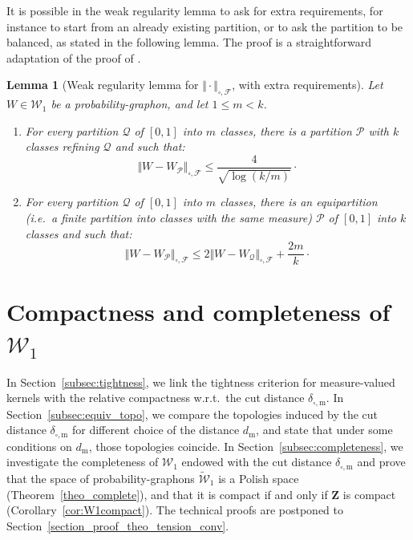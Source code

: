 \documentclass{amsart}
\newcommand{\wrt}{w.r.t.\ }
\newcommand{\ie}{i.e.\ }
\theoremstyle{plain}
\newtheorem{lemme}[Th]{Lemma}
\theoremstyle{definition}
\newcommand{\Space}{\mathbf{Z}}
\newcommand{\Graphon}{\mathcal{W}_1}
\newcommand{\UGraphon}{\widetilde{\mathcal{W}}_1}
\newcommand{\m}{\mathrm{m}}
\newcommand{\dmeas}{d_\m}
\newcommand{\ddcut}{\delta_{\square,\m}}
\newcommand{\NcutFSymbol}{\Vert\cdot\Vert_{\square,\mathcal{F}}}
\newcommand{\F}{\mathcal{F}}
\newcommand{\norm}[1]{\Vert#1\Vert}
\begin{document}
It is possible in the weak regularity lemma to ask for extra requirements,
for instance to start from an already existing partition,
or to ask the partition to be balanced,
as stated in the following lemma.
The proof is a straightforward adaptation of the proof of \cite[Lemma~9.15]{Lovasz}.

\begin{lemme}[Weak regularity lemma for $\NcutFSymbol$, with extra requirements]\label{Regularity_Lemma_2}
Let $W\in\Graphon$ be a probability-graphon, and let $1\leq m < k$.
\begin{enumerate}[label=(\roman*)]
\item\label{Regularity_Lemma_2a} For every partition $\mathcal{Q}$ of $[0,1]$ into $m$ classes,
there is a partition $\mathcal{P}$ with $k$ classes refining $\mathcal{Q}$
and such that:
\[  \norm{W - W_\mathcal{P}}_{\square,\F} \leq \frac{4}{\sqrt{\log (k/m)}}
\cdot \]
\item\label{Regularity_Lemma_2b} For every partition $\mathcal{Q}$ of $[0,1]$ into $m$ classes,
there is an equipartition (\ie a finite partition into classes with the same measure)
$\mathcal{P}$ of $[0,1]$ into $k$ classes and such that:
\[  \norm{W - W_\mathcal{P}}_{\square,\F} \leq 2 \norm{W - W_\mathcal{Q}}_{\square,\F} + \frac{2m}{k}
\cdot \]
\end{enumerate}
\end{lemme}





\section{Compactness and completeness of \texorpdfstring{$\Graphon$}{}}
\label{section_tension}

In Section~\ref{subsec:tightness},  we link the tightness  criterion for
measure-valued kernels  with the relative compactness \wrt  the cut distance
$\ddcut$.  In Section~\ref{subsec:equiv_topo}, we compare the topologies
induced  by  the cut  distance  $\ddcut$  for  different choice  of  the
distance $\dmeas$,  and state  that under  some conditions  on $\dmeas$,
those  topologies  coincide.  In  Section~\ref{subsec:completeness},  we
investigate the completeness of $\Graphon$ endowed with the cut distance
$\ddcut$ and prove that the space of probability-graphons $\UGraphon$ is
a Polish space (Theorem~\ref{theo_complete}), and  that it is compact if
and only  if $\Space$  is compact  (Corollary~\ref{cor:W1compact}).  The
technical        proofs        are         postponed        to        
Section~\ref{section_proof_theo_tension_conv}.
\end{document}
